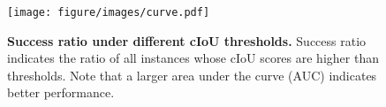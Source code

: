 \begin{figure}[t]
    \centering
	\texttt{[image: figure/images/curve.pdf]}
 	\vspace{-2mm}
     \caption{\textbf{Success ratio under different cIoU thresholds.}
     Success ratio indicates the ratio of all instances whose cIoU scores are higher than  thresholds. Note that a larger area under the curve (AUC) indicates better performance.
     }
	\vspace{\figmargin}
	\vspace{-2mm}
	\label{fig:curve}
\end{figure}
